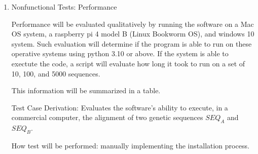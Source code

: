 \documentclass[12pt, titlepage]{article}
\begin{document}
\begin{enumerate}

\item{Nonfunctional Tests: Performance}



Performance will be evaluated qualitatively by running the software on a Mac OS system, a raspberry pi 4 model B (Linux Bookworm OS), and 
windows 10 system. Such evaluation will determine if the program is able to run on these operative systems using python 3.10 or above. If the system 
is able to exectute the code, a script will evaluate how long it took to run on a set of 10, 100, and 5000 sequences.

This information will be summarized in a table.

					
					

Test Case Derivation: Evaluates the software's ability to execute, in a commercial computer, the alignment of two genetic sequences
 $SEQ_A$ and $SEQ_B$.


How test will be performed: manually implementing the installation process.

\end{enumerate}
\end{document}
